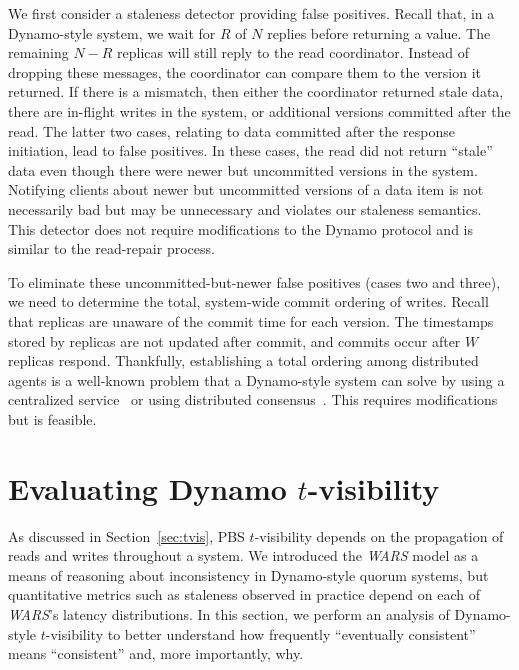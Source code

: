 \documentclass{vldb}
\newcommand{\sectionskip}{-0em}
\begin{document}
We first consider a staleness detector providing false positives.
Recall that, in a Dynamo-style system, we wait for $R$ of $N$ replies
before returning a value.  The remaining $N-R$ replicas will still
reply to the read coordinator.  Instead of dropping these messages,
the coordinator can compare them to the version it returned.  If there
is a mismatch, then either the coordinator returned stale data, there
are in-flight writes in the system, or additional versions committed
after the read. The latter two cases, relating to data committed after
the response initiation, lead to false positives.  In these cases,
the read did not return ``stale'' data even though there were newer
but uncommitted versions in the system.  Notifying clients about newer
but uncommitted versions of a data item is not necessarily bad but may
be unnecessary and violates our staleness semantics.  This detector
does not require modifications to the Dynamo protocol and is similar
to the read-repair process.

To eliminate these uncommitted-but-newer false positives (cases two
and three), we need to determine the total, system-wide commit
ordering of writes. Recall that replicas are unaware of the commit
time for each version. The timestamps stored by replicas are not
updated after commit, and commits occur after $W$ replicas
respond. Thankfully, establishing a total ordering among distributed
agents is a well-known problem that a Dynamo-style system can solve by
using a centralized service~\cite{zookeeper} or using distributed
consensus~\cite{paxos}. This requires modifications but is feasible.



\vspace{\sectionskip}\section{Evaluating Dynamo {\large $t$}-visibility}
\label{sec:dynamoeval}

As discussed in Section~\ref{sec:tvis}, PBS $t$-visibility depends on
the propagation of reads and writes throughout a system.  We
introduced the \textit{WARS} model as a means of reasoning about
inconsistency in Dynamo-style quorum systems, but quantitative metrics
such as staleness observed in practice depend on each of
\textit{WARS}'s latency distributions.  In this section, we perform an
analysis of Dynamo-style $t$-visibility to better understand how
frequently ``eventually consistent'' means ``consistent'' and, more
importantly, why.
\end{document}
